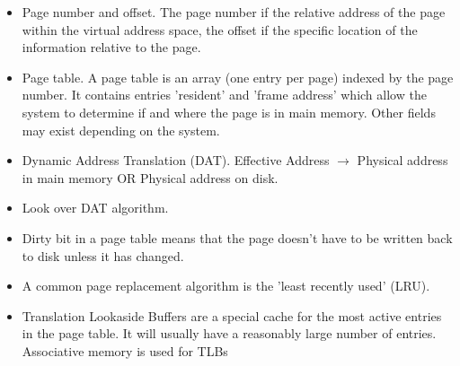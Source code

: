 \documentclass{article}
\begin{document}
\begin{itemize}
\item Page number and offset. The page number if the relative address of the page within the virtual address space, the offset if the specific location of the information relative to the page.
\item Page table. A page table is an array (one entry per page) indexed by the page number. It contains entries 'resident' and 'frame address' which allow the system to determine if and where the page is in main memory. Other fields may exist depending on the system.
\item Dynamic Address Translation (DAT). Effective Address $\rightarrow$ Physical address in main memory OR Physical address on disk.
\item Look over DAT algorithm.
\item Dirty bit in a page table means that the page doesn't have to be written back to disk unless it has changed.
\item A common page replacement algorithm is the 'least recently used' (LRU).
\item Translation Lookaside Buffers are a special cache for the most active entries in the page table. It will usually have a reasonably large number of entries. Associative memory is used for TLBs
\end{itemize}
\end{document}
